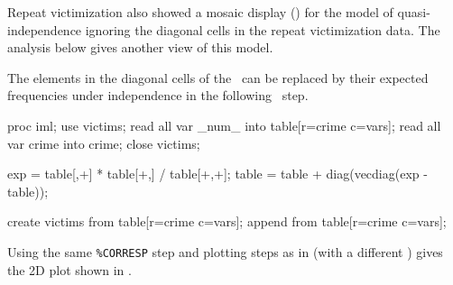 \begin{Example}[victims3]{Repeat victimization}
 also showed a mosaic display 
() for the model of quasi-independence
ignoring the diagonal cells in the repeat victimization data.
The analysis below gives another view of this model.

The elements in the diagonal cells of the  \Dset\
can be replaced by their expected frequencies under independence
in the following \IML\ step.
\begin{listing}
proc iml;
   use victims;
   read all var _num_  into table[r=crime c=vars];
   read all var {crime} into crime;
   close victims;

   exp = table[,+] * table[+,] / table[+,+];
   table = table + diag(vecdiag(exp - table));

   create victims from table[r=crime c=vars];
   append from table[r=crime c=vars];
\end{listing}
Using the same \verb|%CORRESP| step and plotting steps
as in  (with a different )
gives the 2D plot shown in
.


\end{Example}
